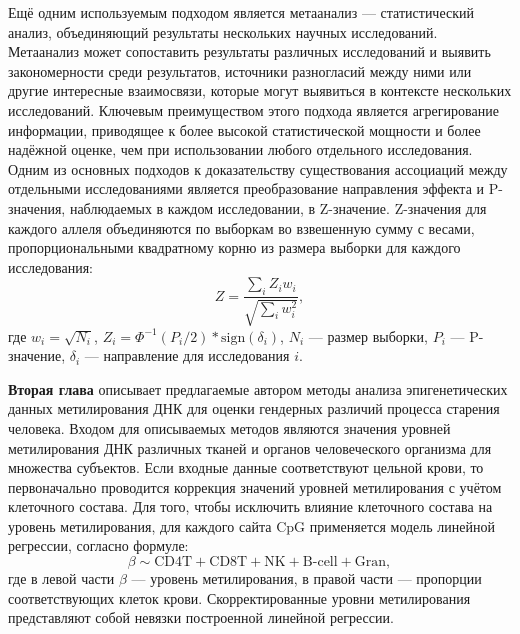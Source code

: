 Ещё одним используемым подходом является метаанализ --- статистический анализ, объединяющий результаты нескольких научных исследований. Метаанализ может сопоставить результаты различных исследований и выявить закономерности среди результатов, источники разногласий между ними или другие интересные взаимосвязи, которые могут выявиться в контексте нескольких исследований. Ключевым преимуществом этого подхода является агрегирование информации, приводящее к более высокой статистической мощности и более надёжной оценке, чем при использовании любого отдельного исследования. Одним из основных подходов к доказательству существования ассоциаций между отдельными исследованиями является преобразование направления эффекта и P-значения, наблюдаемых в каждом исследовании, в Z-значение. Z-значения для каждого аллеля объединяются по выборкам во взвешенную сумму с весами, пропорциональными квадратному корню из размера выборки для каждого исследования:
\[
Z=\frac{\sum_{i}Z_i w_i}{\sqrt{\sum_{i}w_i^2}},
\]
где $w_i = \sqrt{N_i}$, $Z_i = \Phi^{-1}\left(P_i/2\right) * \text{sign}(\delta_i)$, $N_i$ --- размер выборки, $P_i$ --- P-значение, $\delta_i$ --- направление для исследования $i$.
 
\textbf{Вторая глава} описывает предлагаемые автором методы анализа эпигенетических данных метилирования ДНК для оценки гендерных различий процесса старения человека. Входом для описываемых методов являются значения уровней метилирования ДНК различных тканей и органов человеческого организма для множества субъектов. Если входные данные соответствуют цельной крови, то первоначально проводится коррекция значений уровней метилирования с учётом клеточного состава. Для того, чтобы исключить влияние клеточного состава на уровень метилирования, для каждого сайта CpG применяется модель линейной регрессии, согласно формуле:
\[
\beta \sim \text{CD4T} + \text{CD8T} + \text{NK} + \text{B-cell} + \text{Gran},
\]
где в левой части $\beta$ --- уровень метилирования, в правой части --- пропорции соответствующих клеток крови. Скорректированные уровни метилирования представляют собой невязки построенной линейной регрессии. 

